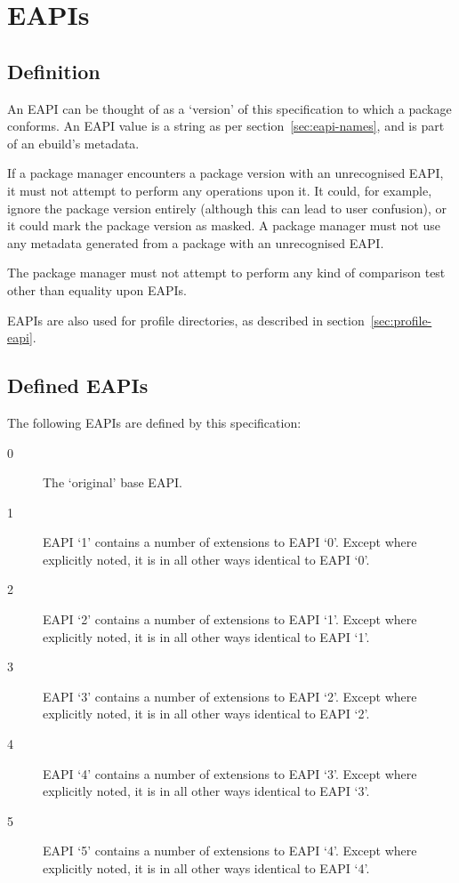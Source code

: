 \chapter{EAPIs}

\section{Definition}

An EAPI can be thought of as a `version' of this specification to which a package conforms. An EAPI
value is a string as per section~\ref{sec:eapi-names}, and is part of an ebuild's metadata.

If a package manager encounters a package version with an unrecognised EAPI, it must not attempt to
perform any operations upon it. It could, for example, ignore the package version entirely (although
this can lead to user confusion), or it could mark the package version as masked. A package manager
must not use any metadata generated from a package with an unrecognised EAPI.

The package manager must not attempt to perform any kind of comparison test other than equality upon
EAPIs.

EAPIs are also used for profile directories, as described in section~\ref{sec:profile-eapi}.

\section{Defined EAPIs}

The following EAPIs are defined by this specification:

\begin{description}
\item[0] The `original' base EAPI.
\item[1] EAPI `1' contains a number of extensions to EAPI `0'. Except where explicitly noted, it is
    in all other ways identical to EAPI `0'.
\item[2] EAPI `2' contains a number of extensions to EAPI `1'. Except where explicitly noted, it is
    in all other ways identical to EAPI `1'.
\item[3] EAPI `3' contains a number of extensions to EAPI `2'. Except where explicitly noted, it is
    in all other ways identical to EAPI `2'.
\item[4] EAPI `4' contains a number of extensions to EAPI `3'. Except where explicitly noted, it is
    in all other ways identical to EAPI `3'.
\item[5] EAPI `5' contains a number of extensions to EAPI `4'. Except where explicitly noted, it is
    in all other ways identical to EAPI `4'.
\end{description}

